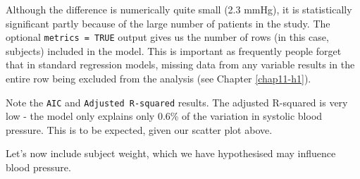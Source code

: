 \documentclass[
  12pt,
  krantz2]{krantz}
\makeatletter
\newenvironment{Shaded}{\begin{snugshade}}{\end{snugshade}}
\newcommand{\DataTypeTok}[1]{\textcolor[rgb]{0.13,0.29,0.53}{#1}}
\newcommand{\KeywordTok}[1]{\textcolor[rgb]{0.13,0.29,0.53}{\textbf{#1}}}
\newcommand{\NormalTok}[1]{#1}
\newcommand{\OperatorTok}[1]{\textcolor[rgb]{0.81,0.36,0.00}{\textbf{#1}}}
\newcommand{\OtherTok}[1]{\textcolor[rgb]{0.56,0.35,0.01}{#1}}
\newcommand{\StringTok}[1]{\textcolor[rgb]{0.31,0.60,0.02}{#1}}
\newenvironment{kframe}{%
\medskip{}
\setlength{\fboxsep}{.8em}
 \def\at@end@of@kframe{}%
 \ifinner\ifhmode%
  \def\at@end@of@kframe{\end{minipage}}%
  \begin{minipage}{\columnwidth}%
 \fi\fi%
 \def\FrameCommand##1{\hskip\@totalleftmargin \hskip-\fboxsep
 \colorbox{shadecolor}{##1}\hskip-\fboxsep
     \hskip-\linewidth \hskip-\@totalleftmargin \hskip\columnwidth}%
 \MakeFramed {\advance\hsize-\width
   \@totalleftmargin\z@ \linewidth\hsize
   \@setminipage}}%
 {\par\unskip\endMakeFramed%
 \at@end@of@kframe}
\renewenvironment{Shaded}{\begin{kframe}}{\end{kframe}}
\makeatother
\begin{document}
Although the difference is numerically quite small (2.3 mmHg), it is statistically significant partly because of the large number of patients in the study.
The optional \texttt{metrics\ =\ TRUE} output gives us the number of rows (in this case, subjects) included in the model.
This is important as frequently people forget that in standard regression models, missing data from any variable results in the entire row being excluded from the analysis (see Chapter \ref{chap11-h1}).

Note the \texttt{AIC} and \texttt{Adjusted\ R-squared} results.
The adjusted R-squared is very low - the model only explains only 0.6\% of the variation in systolic blood pressure.
This is to be expected, given our scatter plot above.

Let's now include subject weight, which we have hypothesised may influence blood pressure.

\begin{Shaded}
\end{Shaded}

\begin{table}[!h]

\caption{\label{tab:chap07-tab-bp-personality-weight}Multivariable linear regression: Systolic blood pressure by personality type and weight.}
\centering
{}
\end{table}
\end{document}
